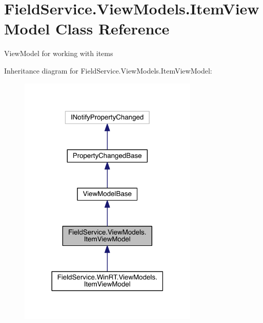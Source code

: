\hypertarget{class_field_service_1_1_view_models_1_1_item_view_model}{\section{Field\+Service.\+View\+Models.\+Item\+View\+Model Class Reference}
\label{class_field_service_1_1_view_models_1_1_item_view_model}
}


View\+Model for working with items  




Inheritance diagram for Field\+Service.\+View\+Models.\+Item\+View\+Model\+:
\nopagebreak
\begin{figure}[H]
\begin{center}
\leavevmode
\includegraphics[width=242pt]{class_field_service_1_1_view_models_1_1_item_view_model__inherit__graph}
\end{center}
\end{figure}


